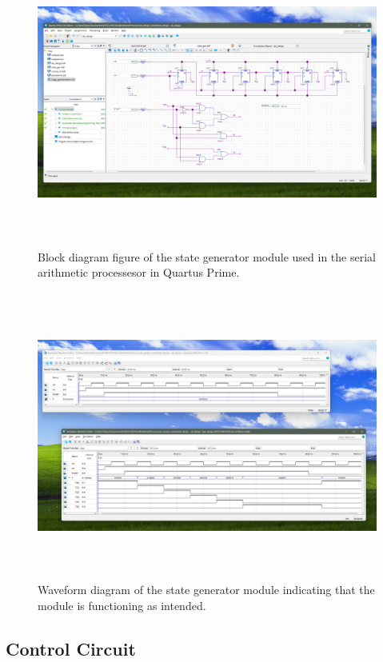 \documentclass[11pt,a4paper,english]{article}
\begin{document}
   \begin{figure}[h!]
    \centering
    \includegraphics*[height=95mm]{./ss/StageGenBDF.png}
    \caption{Block diagram figure of the state generator module used in the serial arithmetic processesor in Quartus Prime.}
    \label{figure}
   \end{figure}

   \begin{figure}[h!]
    \centering
    \includegraphics[height=95mm]{./ss/StageGenWaveform.png}
    \caption{Waveform diagram of the state generator module indicating that the module is functioning as intended.}
    \label{figure}
   \end{figure}

\pagebreak
  \subsection*{Control Circuit}
\end{document}
